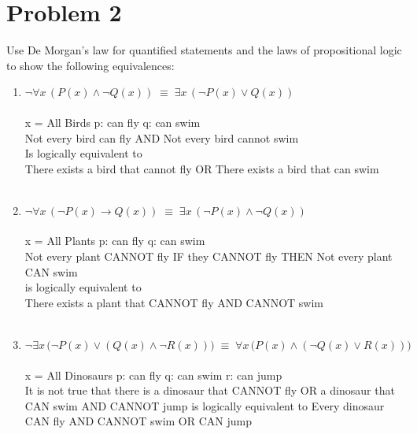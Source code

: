 \newpage


\section*{Problem 2}

Use De Morgan's law for quantified statements and the laws of propositional logic to show the following equivalences:\\
\begin{enumerate}[label=(\alph*)]
\item $\neg \forall x \, \left(P(x) \land \neg Q(x) \right)\; \equiv \; \exists x \, \left(\neg P(x) \lor  Q(x) \right)$\\\\
x = All Birds p: can fly q: can swim \\
Not every bird can fly AND Not every bird cannot swim \\
Is logically equivalent to \\
There exists a bird that cannot fly OR There exists a bird that can swim
\\\\
\item $\neg \forall x \, \left(\neg P(x) \to Q(x) \right)\; \equiv \; \exists x \, \left(\neg P(x) \land  \neg Q(x) \right)$\\\\
x = All Plants p: can fly q: can swim\\
Not every plant CANNOT fly IF they CANNOT fly THEN Not every plant CAN swim \\
is logically equivalent to \\
There exists a plant that CANNOT fly AND CANNOT swim
\\\\
\item $\neg \exists x \, \big(\neg P(x) \lor \left(Q(x) \land \neg R(x) \right)\big)\; \equiv \; \forall x \,\big( P(x) \land \left( \neg Q(x) \lor R(x) \right)\big)$\\\\
x = All Dinosaurs p: can fly q: can swim r: can jump\\
It is not true that there is a dinosaur that CANNOT fly OR a dinosaur that CAN swim AND CANNOT jump
is logically equivalent to 
Every dinosaur CAN fly AND CANNOT swim OR CAN jump

\\\\
\end{enumerate}



